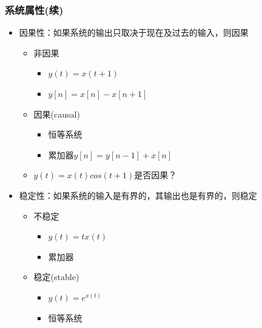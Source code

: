 \documentclass[CJKutf8,xcolor=pdftex,dvipsnames,table]{beamer}
\begin{document}
\begin{CJK*}{UTF8}{song}
  \begin{frame}
    \frametitle{系统属性(续)}
    \begin{itemize}
    \item 因果性：如果系统的输出只取决于现在及过去的输入，则因果
        \begin{itemize}
        \item 非因果
            \begin{itemize}
            \item $y(t)=x(t+1)$
            \item $y[n]=x[n]-x[n+1]$
            \end{itemize}
        \item 因果(causal)    
            \begin{itemize}
            \item 恒等系统
	   \item 累加器$y[n]=y[n-1]+x[n]$
            \end{itemize}
        \item $y(t)=x(t)cos(t+1)$是否因果？
        \end{itemize}     
    \item 稳定性：如果系统的输入是有界的，其输出也是有界的，则稳定
        \begin{itemize}
        \item 不稳定
            \begin{itemize}
            \item $y(t)=tx(t)$
            \item 累加器
            \end{itemize}
        \item 稳定(stable)    
            \begin{itemize}
            \item $y(t)=e^{x(t)}$
	   \item 恒等系统
            \end{itemize}
        \end{itemize}     
    \end{itemize} 
  \end{frame}


\end{CJK*}
\end{document}
